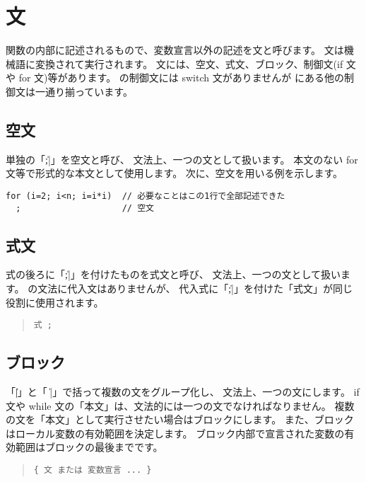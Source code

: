 \section{文}

関数の内部に記述されるもので、変数宣言以外の記述を文と呼びます。
文は機械語に変換されて実行されます。
文には、空文、式文、ブロック、制御文(if 文や for 文)等があります。
\cmml の制御文には switch 文がありませんが
\cl にある他の制御文は一通り揃っています。

\subsection{空文}

単独の「\|;|」を空文と呼び、
文法上、一つの文として扱います。
本文のない for 文等で形式的な本文として使用します。
次に、空文を用いる例を示します。

\begin{mylist}
\begin{verbatim}
for (i=2; i<n; i=i*i)  // 必要なことはこの1行で全部記述できた
  ;                    // 空文
\end{verbatim}
\end{mylist}

\subsection{式文}

式の後ろに「\|;|」を付けたものを式文と呼び、
文法上、一つの文として扱います。
\cmml の文法に代入文はありませんが、
代入式に「\|;|」を付けた「式文」が同じ役割に使用されます。

\begin{quote}
\begin{verbatim}
式 ;
\end{verbatim}
\end{quote}

\subsection{ブロック}

「\|{|」と「 \|}|」で括って複数の文をグループ化し、
文法上、一つの文にします。
if 文や while 文の「本文」は、文法的には一つの文でなければなりません。
複数の文を「本文」として実行させたい場合はブロックにします。
また、ブロックはローカル変数の有効範囲を決定します。
ブロック内部で宣言された変数の有効範囲はブロックの最後までです。

\begin{quote}
\begin{verbatim}
{ 文 または 変数宣言 ... }
\end{verbatim}
\end{quote}

